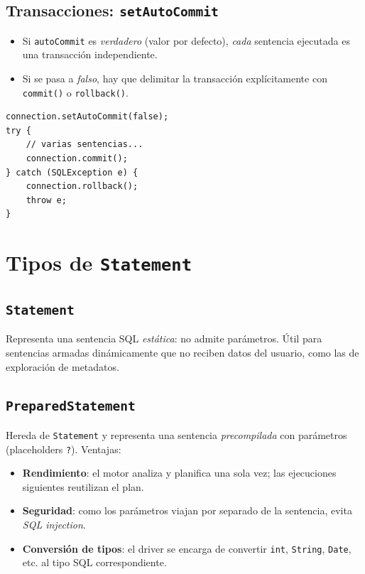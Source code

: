 \documentclass[11pt,a4paper]{article}
\begin{document}
\subsection*{Transacciones: \texttt{setAutoCommit}}

\begin{itemize}
    \item Si \texttt{autoCommit} es \emph{verdadero} (valor por
    defecto), \emph{cada} sentencia ejecutada es una transacción
    independiente.
    \item Si se pasa a \emph{falso}, hay que delimitar la transacción
    explícitamente con \texttt{commit()} o \texttt{rollback()}.
\end{itemize}

\begin{lstlisting}
connection.setAutoCommit(false);
try {
    // varias sentencias...
    connection.commit();
} catch (SQLException e) {
    connection.rollback();
    throw e;
}
\end{lstlisting}

\section{Tipos de \texttt{Statement}}

\subsection*{\texttt{Statement}}

Representa una sentencia SQL \emph{estática}: no admite parámetros.
Útil para sentencias armadas dinámicamente que no reciben datos del
usuario, como las de exploración de metadatos.

\subsection*{\texttt{PreparedStatement}}

Hereda de \texttt{Statement} y representa una sentencia
\emph{precompilada} con parámetros (placeholders \texttt{?}).
Ventajas:

\begin{itemize}
    \item \textbf{Rendimiento}: el motor analiza y planifica una sola
    vez; las ejecuciones siguientes reutilizan el plan.
    \item \textbf{Seguridad}: como los parámetros viajan por separado
    de la sentencia, evita \emph{SQL injection}.
    \item \textbf{Conversión de tipos}: el driver se encarga de
    convertir \texttt{int}, \texttt{String}, \texttt{Date}, etc. al
    tipo SQL correspondiente.
\end{itemize}
\end{document}
